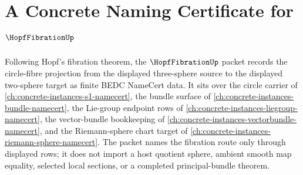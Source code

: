 \chapter{A Concrete Naming Certificate for $\HopfFibrationUp$}
\label{ch:concrete-instances-hopf-fibration-namecert}

Following Hopf's fibration theorem, the $\HopfFibrationUp$ packet records the circle-fibre projection from the displayed three-sphere source to the displayed two-sphere target as finite BEDC NameCert data. It sits over the circle carrier of \autoref{ch:concrete-instances-s1-namecert}, the bundle surface of \autoref{ch:concrete-instances-bundle-namecert}, the Lie-group endpoint rows of \autoref{ch:concrete-instances-liegroup-namecert}, the vector-bundle bookkeeping of \autoref{ch:concrete-instances-vectorbundle-namecert}, and the Riemann-sphere chart target of \autoref{ch:concrete-instances-riemann-sphere-namecert}. The packet names the fibration route only through displayed rows; it does not import a host quotient sphere, ambient smooth map equality, selected local sections, or a completed principal-bundle theorem.

